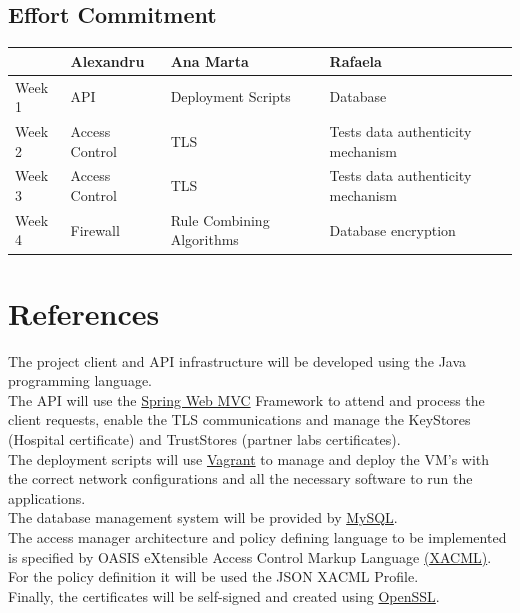 \subsection{Effort Commitment}

\begin{tabularx}{0.8\textwidth} { 
  | >{\centering\arraybackslash}X 
  | >{\centering\arraybackslash}X 
  | >{\centering\arraybackslash}X 
  | >{\centering\arraybackslash}X | }
 \hline
  & Alexandru & Ana Marta & Rafaela \\
 \hline
 Week 1  & API & Deployment Scripts & Database \\
  \hline
  Week 2  & Access Control  & TLS & Tests data authenticity mechanism \\
   \hline
   Week 3  & Access Control  & TLS  & Tests data authenticity mechanism \\
    \hline
    Week 4  & Firewall  & Rule Combining Algorithms  & Database encryption \\
\hline
\end{tabularx}

\section{References}

The project client and API infrastructure will be developed using the Java programming language. \\

The API will use the \href{https://docs.spring.io/spring-framework/docs/3.2.x/spring-framework-reference/html/mvc.html}{Spring Web MVC} Framework to attend and process the client requests, enable the TLS communications and manage the KeyStores (Hospital certificate) and TrustStores (partner labs certificates). \\

The deployment scripts will use \href{https://www.vagrantup.com/}{Vagrant} to manage and deploy the VM's with the correct network configurations and all the necessary software to run the applications. \\

The database management system will be provided by \href{https://www.mysql.com/}{MySQL}. \\

The access manager architecture and policy defining language to be implemented is specified by OASIS eXtensible Access Control Markup Language \href{https://www.oasis-open.org/committees/tc_home.php?wg_abbrev=xacml#other}{(XACML)}. For the policy definition it will be used the JSON XACML Profile. \\

Finally, the certificates will be self-signed and created using \href{https://www.openssl.org/}{OpenSSL}. \\
